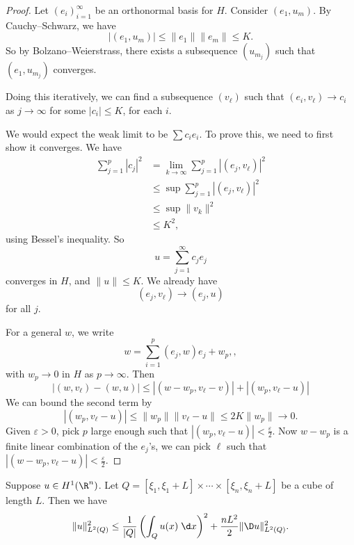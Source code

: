 \documentclass[a4paper]{article}
\begin{document}
\begin{proof}
  Let $(e_i)_{i = 1}^\infty$ be an orthonormal basis for $H$. Consider $(e_1, u_m)$. By Cauchy--Schwarz, we have
  \[
    |(e_1, u_m)| \leq \|e_1\| \|e_m\| \leq K.
  \]
  So by Bolzano--Weierstrass, there exists a subsequence $(u_{m_j})$ such that $(e_1, u_{m_j})$ converges.

  Doing this iteratively, we can find a subsequence $(v_\ell)$ such that $(e_i, v_\ell) \to c_i$ as $j \to \infty$ for some $|c_i| \leq K$, for each $i$.

  We would expect the weak limit to be $\sum c_i e_i$. To prove this, we need to first show it converges. We have
  \begin{align*}
    \sum_{j = 1}^p |c_j|^2 &= \lim_{k \to \infty} \sum_{j = 1}^p |(e_j, v_\ell)|^2\\
    &\leq \sup \sum_{j = 1}^p |(e_j, v_\ell)|^2\\
    &\leq \sup \|v_k\|^2\\
    &\leq K^2,
  \end{align*}
  using Bessel's inequality. So
  \[
    u = \sum_{j = 1}^\infty c_j e_j
  \]
  converges in $H$, and $\|u\| \leq K$. We already have
  \[
    (e_j, v_{\ell}) \to (e_j, u)
  \]
  for all $j$.

  For a general $w$, we write
  \[
    w = \sum_{i = 1}^p (e_j, w) e_j + w_p,,
  \]
  with $w_p \to 0$ in $H$ as $p \to \infty$. Then
  \[
    |(w, v_\ell) - (w, u)| \leq |(w - w_p, v_\ell - v)| + |(w_p, v_\ell - u)|
  \]
  We can bound the second term by
  \[
    |(w_p, v_\ell - u)| \leq \|w_p\| \|v_\ell - u\| \leq 2K \|w_p\| \to 0.
  \]
  Given $\varepsilon > 0$, pick $p$ large enough such that $|(w_p, v_\ell - u)| < \frac{\varepsilon}{2}$. Now $w - w_p$ is a finite linear combination of the $e_j$'s, we can pick $\ell$ such that $|(w - w_p, v_\ell - u)| < \frac{\varepsilon}{2}$.
\end{proof}

\begin{lemma}
  Suppose $u \in H^1(\R^n)$. Let $Q = [\xi_1, \xi_1 + L] \times \cdots \times [\xi_n , \xi_n + L]$ be a cube of length $L$. Then we have
  \[
    \|u\|_{L^2(Q)}^2 \leq \frac{1}{|Q|} \left(\int_Q u(x) \;\d x\right)^2 + \frac{nL^2}{2} \|\D u\|_{L^2(Q)}^2.
  \]
\end{lemma}
\end{document}
